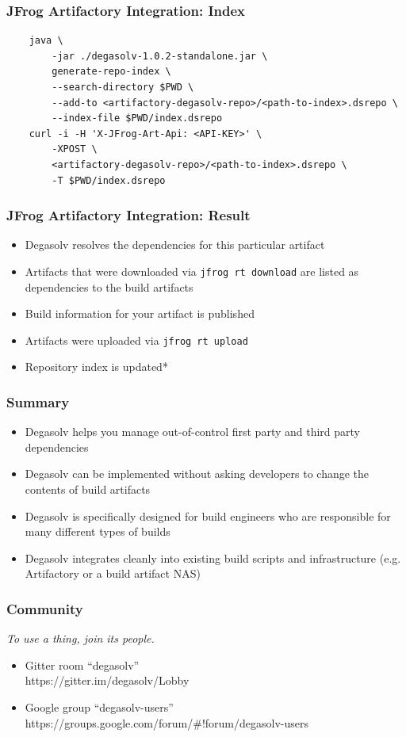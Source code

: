 \documentclass{beamer}
\begin{document}
\begin{frame}[fragile]
\frametitle{JFrog Artifactory Integration: Index}
\begin{verbatim}
    java \
        -jar ./degasolv-1.0.2-standalone.jar \
        generate-repo-index \
        --search-directory $PWD \
        --add-to <artifactory-degasolv-repo>/<path-to-index>.dsrepo \
        --index-file $PWD/index.dsrepo
    curl -i -H 'X-JFrog-Art-Api: <API-KEY>' \
        -XPOST \
        <artifactory-degasolv-repo>/<path-to-index>.dsrepo \
        -T $PWD/index.dsrepo
\end{verbatim}
\end{frame}
\begin{frame}
  \frametitle{JFrog Artifactory Integration: Result}
  \begin{itemize}
  \item Degasolv resolves the dependencies for this particular artifact
  \item Artifacts that were downloaded via \texttt{jfrog rt download} are listed as
    dependencies to the build artifacts
  \item Build information for your artifact is published
  \item Artifacts were uploaded via \texttt{jfrog rt upload}
  \item Repository index is updated*
  \end{itemize}
\end{frame}
\begin{frame}
  \frametitle{Summary}
  \begin{itemize}
  \item Degasolv helps you manage out-of-control first party and third party dependencies
  \item Degasolv can be implemented without asking developers to change the contents
    of build artifacts
  \item Degasolv is specifically designed for build engineers who are responsible for
    many different types of builds
  \item Degasolv integrates cleanly into existing build scripts and infrastructure (e.g.
    Artifactory or a build artifact NAS)
  \end{itemize}
  \end{frame}
\begin{frame}
  \frametitle{Community}
  \textit{To use a thing, join its people.}

  \break

  \begin{itemize}
  \item Gitter room ``degasolv'' \\
    {\small https://gitter.im/degasolv/Lobby}
  \item Google group ``degasolv-users'' \\
    {\small https://groups.google.com/forum/\#!forum/degasolv-users}
  \end{itemize}
\end{frame}
\end{document}
